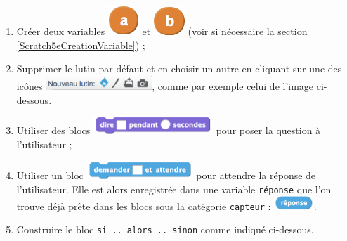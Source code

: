 \begin{enumerate}
\item Créer deux variables \includegraphics[width=.7cm]{./images/scratch02/2variableA} et \includegraphics[width=.7cm]{./images/scratch02/2variableB} (voir si nécessaire la section \vref{Scratch5eCreationVariable}) ;
\item Supprimer le lutin par défaut et en choisir un autre en cliquant sur une des icônes \includegraphics[width=4cm]{./images/scratch02/2nouveauLutin}, comme par exemple celui de l'image ci-dessous.


\item Utiliser des blocs \includegraphics[width=4.5cm]{./images/scratch02/2blocDire} pour poser la question à l'utilisateur ;

\item Utiliser un bloc \includegraphics[width=4cm]{./images/scratch02/2blocDemander} pour attendre la réponse de l'utilisateur. Elle est alors enregistrée dans une variable \texttt{réponse} que l'on trouve déjà prête dans les blocs sous la catégorie \texttt{capteur} : \includegraphics[width=1.5cm]{./images/scratch02/2reponse}.

\item Construire le bloc \texttt{si .. alors .. sinon} comme indiqué ci-dessous.

\end{enumerate}



